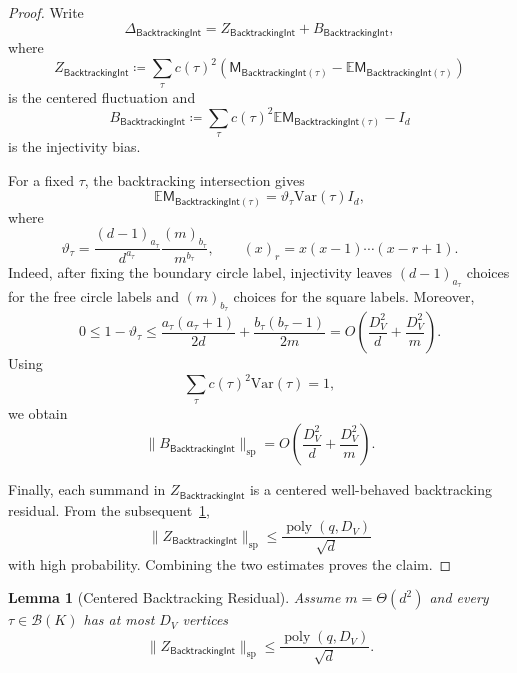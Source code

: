 \documentclass[12pt]{article}
\def \E {\mathbb{E}}
\newcommand{\Var}{\mathrm{Var}}
\newtheorem{lemma}[theorem]{Lemma}
\newcommand{\poly}{\operatorname{poly}}
\newcommand{\calB}{\mathcal{B}}
\newcommand{\cm}{\mathsf{M} }
\newcommand{\bti}{\mathsf{BacktrackingInt}}
\begin{document}
\begin{proof}
Write
\[
    \Delta_{\bti}=Z_{\bti}+B_{\bti},
\]
where
\[
    Z_{\bti}
    \coloneqq
    \sum_{\tau}
    c(\tau)^2
    \left(
        \cm_{\bti(\tau)}
        -
        \E\cm_{\bti(\tau)}
    \right)
\]
is the centered fluctuation and
\[
    B_{\bti}
    \coloneqq
    \sum_{\tau}
    c(\tau)^2\E\cm_{\bti(\tau)}-I_d
\]
is the injectivity bias.

For a fixed \(\tau\), the backtracking intersection gives
\[
    \E\cm_{\bti(\tau)}
    =
    \vartheta_\tau\Var(\tau)I_d,
\]
where
\[
    \vartheta_\tau
    =
    \frac{(d-1)_{a_\tau}}{d^{a_\tau}}
    \frac{(m)_{b_\tau}}{m^{b_\tau}},
    \qquad
    (x)_r=x(x-1)\cdots(x-r+1).
\]
Indeed, after fixing the boundary circle label, injectivity leaves
\((d-1)_{a_\tau}\) choices for the free circle labels and
\((m)_{b_\tau}\) choices for the square labels. Moreover,
\[
    0\leq 1-\vartheta_\tau
    \leq
    \frac{a_\tau(a_\tau+1)}{2d}
    +
    \frac{b_\tau(b_\tau-1)}{2m}
    =
    O\left(
        \frac{D_V^2}{d}
        +
        \frac{D_V^2}{m}
    \right).
\]
Using
\[
    \sum_{\tau}c(\tau)^2\Var(\tau)=1,
\]
we obtain
\[
    \|B_{\bti}\|_{\mathrm{sp}}
    =
    O\left(
        \frac{D_V^2}{d}
        +
        \frac{D_V^2}{m}
    \right).
\]

Finally, each summand in \(Z_{\bti}\) is a centered well-behaved
backtracking residual. From the subsequent~\cref{lem:centered-sc-backtracking}, \[
    \|Z_{\bti}\|_{\mathrm{sp}}
    \leq
    \frac{\poly(q,D_V)}{\sqrt d}
\]
with high probability. Combining the two estimates proves the claim.
\end{proof}

\begin{lemma}[Centered Backtracking Residual]
\label{lem:centered-sc-backtracking}
Assume \(m=\Theta(d^2)\) and every
\(\tau\in\calB(K)\) has at most \(D_V\) vertices
\[
    \|Z_{\bti}\|_{\mathrm{sp}}
    \leq
    \frac{\poly(q,D_V)}{\sqrt d}.
\]
\end{lemma}
\end{document}
